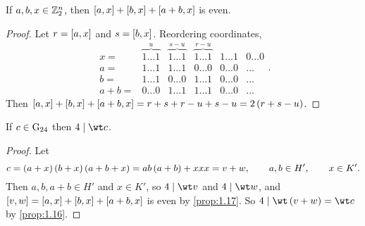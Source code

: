 \begin{proposition}
\label{prop:1.17}
If $ a, b, x \in \mathbb{Z}_2^n $, then $ \sbr{a, x} + \sbr{b, x} + \sbr{a + b, x} $ is even.
\end{proposition}

\begin{proof}
Let $ r = \sbr{a, x} $ and $ s = \sbr{b, x} $. Reordering coordinates,
$$
\begin{array}{rccccc}
x = & \overbrace{1 \dots 1}^u & \overbrace{1 \dots 1}^{s - u} & \overbrace{1 \dots 1}^{r - u} & 1 \dots 1 & 0 \dots 0 \\
a = & 1 \dots 1 & 1 \dots 1 & 0 \dots 0 & 0 \dots 0 & \dots \\
b = & 1 \dots 1 & 0 \dots 0 & 1 \dots 1 & 0 \dots 0 & \dots \\
a + b = & 0 \dots 0 & 1 \dots 1 & 1 \dots 1 & 0 \dots 0 & \dots
\end{array}.
$$
Then $ \sbr{a, x} + \sbr{b, x} + \sbr{a + b, x} = r + s + r - u + s - u = 2\br{r + s - u} $.
\end{proof}

\begin{proposition}
\label{prop:1.18}
If $ c \in \mathrm{G}_{24} $ then $ 4 \mid \wt c $.
\end{proposition}

\begin{proof}
Let
$$ c = \br{a + x}\br{b + x}\br{a + b + x} = ab\br{a + b} + xxx = v + w, \qquad a, b \in H', \qquad x \in K'. $$
Then $ a, b, a + b \in H' $ and $ x \in K' $, so $ 4 \mid \wt v $ and $ 4 \mid \wt w $, and $ \sbr{v, w} = \sbr{a, x} + \sbr{b, x} + \sbr{a + b, x} $ is even by \ref{prop:1.17}. So $ 4 \mid \wt \br{v + w} = \wt c $ by \ref{prop:1.16}.
\end{proof}

\pagebreak

